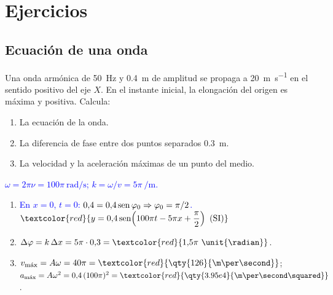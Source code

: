 
\section{Ejercicios}\label{sec:ond-ejercicios}

\subsection{Ecuación de una onda}

\begin{exercise}
    Una onda armónica de \qty{50}{\hertz} y \qty{0.4}{\m} de amplitud se propaga a \qty{20}{\m\per\second} en el sentido
    positivo del eje \(X\). En el instante inicial, la elongación del origen es máxima y positiva. Calcula:
    \begin{enumerate}[label=\letraminuscula]
        \item La ecuación de la onda.
        \item La diferencia de fase entre dos puntos separados \qty{0.3}{\m}.
        \item La velocidad y la aceleración máximas de un punto del medio.
    \end{enumerate}
    \begin{solu}
        \textcolor{blue}{\(\omega = 2\pi\nu = 100\pi\ \unit{\radian\per\second}\); \(k = \omega/v = 5\pi\ \unit{\per\m}\).}
        \begin{enumerate}[label=\letraminuscula]
            \item \textcolor{blue}{En \(x = 0\), \(t = 0\): \(0{,}4 = 0{,}4\operatorname{sen}\varphi_0 \Rightarrow \varphi_0 = \pi/2\).}
            \(\textcolor{red}{y = 0{,}4\sen\!\left(100\pi t - 5\pi x + \dfrac{\pi}{2}\right)\ \text{(SI)}}\)
            \item \(\Delta\varphi = k\,\Delta x = 5\pi\cdot 0{,}3 = \textcolor{red}{1{,}5\pi\ \unit{\radian}}\).
            \item \(v_{\text{máx}} = A\omega = 40\pi = \textcolor{red}{\qty{126}{\m\per\second}}\);
            \(a_{\text{máx}} = A\omega^2 = 0{,}4\,(100\pi)^2 = \textcolor{red}{\qty{3.95e4}{\m\per\second\squared}}\).
        \end{enumerate}
    \end{solu}
\end{exercise}

